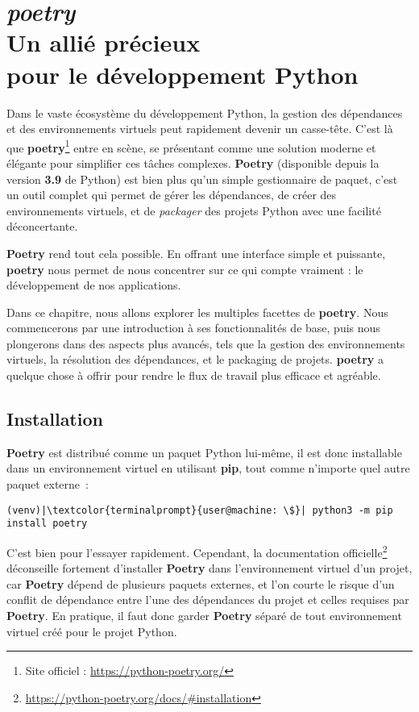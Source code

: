 \chapter[\textit{poetry}]{\textit{poetry} \\ Un allié précieux \\ pour le développement Python}

\bigskip

Dans le vaste écosystème du développement Python, la gestion des dépendances et des environnements virtuels peut rapidement devenir un casse-tête. C'est là que \textbf{poetry}\footnote{Site officiel : \url{https://python-poetry.org/}} entre en scène, se présentant comme une solution moderne et élégante pour simplifier ces tâches complexes. \textbf{Poetry} (disponible depuis la version \textbf{3.9} de Python) est bien plus qu'un simple gestionnaire de paquet, c'est un outil complet qui permet de gérer les dépendances, de créer des environnements virtuels, et de \textit{packager} des projets Python avec une facilité déconcertante.

\textbf{Poetry} rend tout cela possible. En offrant une interface simple et puissante, \textbf{poetry} nous permet de nous concentrer sur ce qui compte vraiment : le développement de nos applications.

Dans ce chapitre, nous allons explorer les multiples facettes de \textbf{poetry}. Nous commencerons par une introduction à ses fonctionnalités de base, puis nous plongerons dans des aspects plus avancés, tels que la gestion des environnements virtuels, la résolution des dépendances, et le packaging de projets. \textbf{poetry} a quelque chose à offrir pour rendre le flux de travail plus efficace et agréable.

\section{Installation}
\textbf{Poetry} est distribué comme un paquet Python lui-même, il est donc installable dans un environnement virtuel en utilisant \textbf{pip}, tout comme n’importe quel autre paquet externe :
\begin{lstlisting}[style=terminal]
(venv)|\textcolor{terminalprompt}{user@machine: \$}| python3 -m pip install poetry
\end{lstlisting}

C’est bien pour l’essayer rapidement. Cependant, la documentation officielle\footnote{\url{https://python-poetry.org/docs/\#installation}} déconseille fortement d’installer \textbf{Poetry} dans l'environnement virtuel d'un projet, car \textbf{Poetry} dépend de plusieurs paquets externes, et l'on courte le risque d’un conflit de dépendance entre l’une des dépendances du projet et celles requises par \textbf{Poetry}. En pratique, il faut donc garder \textbf{Poetry} séparé de tout environnement virtuel créé pour le projet Python. 

